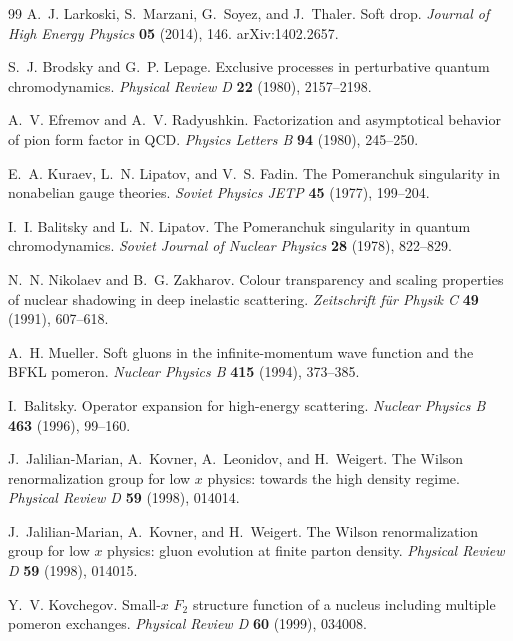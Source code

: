 \begin{thebibliography}{99}
A.~J. Larkoski, S.~Marzani, G.~Soyez, and J.~Thaler.
Soft drop.
\emph{Journal of High Energy Physics} \textbf{05} (2014), 146.
arXiv:1402.2657.

S.~J. Brodsky and G.~P. Lepage.
Exclusive processes in perturbative quantum chromodynamics.
\emph{Physical Review D} \textbf{22} (1980), 2157--2198.

A.~V. Efremov and A.~V. Radyushkin.
Factorization and asymptotical behavior of pion form factor in QCD.
\emph{Physics Letters B} \textbf{94} (1980), 245--250.

E.~A. Kuraev, L.~N. Lipatov, and V.~S. Fadin.
The Pomeranchuk singularity in nonabelian gauge theories.
\emph{Soviet Physics JETP} \textbf{45} (1977), 199--204.

I.~I. Balitsky and L.~N. Lipatov.
The Pomeranchuk singularity in quantum chromodynamics.
\emph{Soviet Journal of Nuclear Physics} \textbf{28} (1978), 822--829.

N.~N. Nikolaev and B.~G. Zakharov.
Colour transparency and scaling properties of nuclear shadowing in deep
inelastic scattering.
\emph{Zeitschrift f\"ur Physik C} \textbf{49} (1991), 607--618.

A.~H. Mueller.
Soft gluons in the infinite-momentum wave function and the BFKL pomeron.
\emph{Nuclear Physics B} \textbf{415} (1994), 373--385.

I.~Balitsky.
Operator expansion for high-energy scattering.
\emph{Nuclear Physics B} \textbf{463} (1996), 99--160.

J.~Jalilian-Marian, A.~Kovner, A.~Leonidov, and H.~Weigert.
The Wilson renormalization group for low \(x\) physics: towards the high
density regime.
\emph{Physical Review D} \textbf{59} (1998), 014014.

J.~Jalilian-Marian, A.~Kovner, and H.~Weigert.
The Wilson renormalization group for low \(x\) physics: gluon evolution at
finite parton density.
\emph{Physical Review D} \textbf{59} (1998), 014015.

Y.~V. Kovchegov.
Small-\(x\) \(F_2\) structure function of a nucleus including multiple pomeron
exchanges.
\emph{Physical Review D} \textbf{60} (1999), 034008.


\end{thebibliography}
